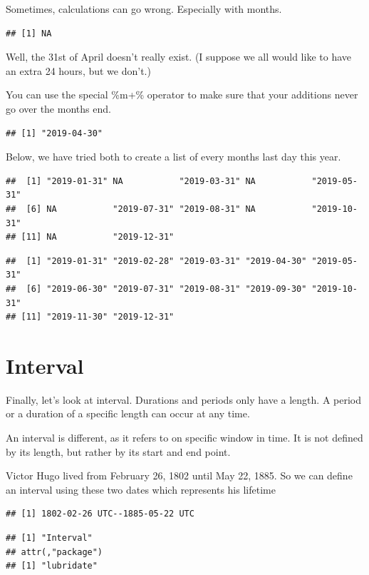 \documentclass[]{tufte-book}
\begin{document}
Sometimes, calculations can go wrong. Especially with months.

\begin{verbatim}
## [1] NA
\end{verbatim}

Well, the 31st of April doesn't really exist. (I suppose we all would like to have an extra 24 hours, but we don't.)

You can use the special \%m+\% operator to make sure that your additions never go over the months end.

\begin{verbatim}
## [1] "2019-04-30"
\end{verbatim}

Below, we have tried both to create a list of every months last day this year.

\begin{verbatim}
##  [1] "2019-01-31" NA           "2019-03-31" NA           "2019-05-31"
##  [6] NA           "2019-07-31" "2019-08-31" NA           "2019-10-31"
## [11] NA           "2019-12-31"
\end{verbatim}

\begin{verbatim}
##  [1] "2019-01-31" "2019-02-28" "2019-03-31" "2019-04-30" "2019-05-31"
##  [6] "2019-06-30" "2019-07-31" "2019-08-31" "2019-09-30" "2019-10-31"
## [11] "2019-11-30" "2019-12-31"
\end{verbatim}

\hypertarget{interval-2}{%
\section{Interval}\label{interval-2}}

Finally, let's look at interval. Durations and periods only have a length. A period or a duration of a specific length can occur at any time.

An interval is different, as it refers to on specific window in time. It is not defined by its length, but rather by its start and end point.

Victor Hugo lived from February 26, 1802 until May 22, 1885. So we can define an interval using these two dates which represents his lifetime

\begin{verbatim}
## [1] 1802-02-26 UTC--1885-05-22 UTC
\end{verbatim}

\begin{verbatim}
## [1] "Interval"
## attr(,"package")
## [1] "lubridate"
\end{verbatim}
\end{document}
